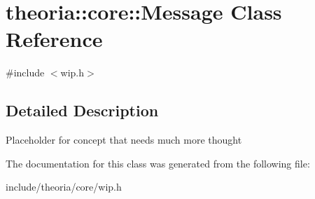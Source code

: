 \hypertarget{classtheoria_1_1core_1_1Message}{}\section{theoria\+:\+:core\+:\+:Message Class Reference}
\label{classtheoria_1_1core_1_1Message}


{\ttfamily \#include $<$wip.\+h$>$}



\subsection{Detailed Description}
Placeholder for concept that needs much more thought 

The documentation for this class was generated from the following file\+:\begin{DoxyCompactItemize}
\item 
include/theoria/core/wip.\+h\end{DoxyCompactItemize}
